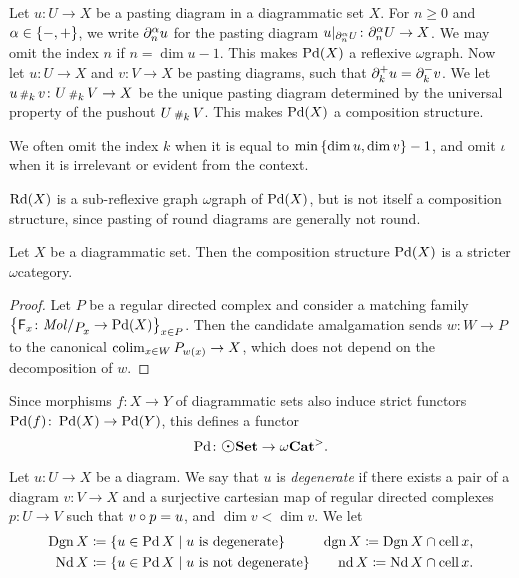 \begin{dfn} 
    Let \( u \colon U \to X \) be a pasting diagram in a diagrammatic set \( X \).
    For \( n \geq 0 \) and \( \alpha \in \left\{ {-, +} \right\} \), we write \( \partial_{n}^{\alpha} u \) for the pasting diagram \( \restr{u}{\bd{n}{\a}U} \colon \bd{n}{\a} U \to X \).
    We may omit the index \( n \) if \( n = \dim u - 1 \).
    This makes \( \operatorname{Pd}(X) \) a reflexive \( \omega \)\nbd graph.
    Now let \( u \colon U \to X \) and \( v \colon V \to X \) be pasting diagrams, such that \( \partial_{k}^{+} u = \partial_{k}^{-} v \).
    We let \( u \,{\scriptstyle\#}_{k}\, v \colon U \,{\scriptstyle\#}_{k}\, V \to X \) be the unique pasting diagram determined by the universal property of the pushout \( U \,{\scriptstyle\#}_{k}\, V \).
    This makes \( \operatorname{Pd}(X) \) a composition structure.
\end{dfn}
\noindent We often omit the index \( k \) when it is equal to \( \min \left\{ {\dim u, \dim v} \right\} - 1 \), and omit \( \iota \) when it is irrelevant or evident from the context.

\begin{rmk}
    \( \operatorname{Rd}(X) \) is a sub-reflexive graph \( \omega \)\nbd graph of \( \operatorname{Pd}(X) \), but is not itself a composition structure, since pasting of round diagrams are generally not round. 
\end{rmk}

\begin{lem} \label{lem:Pd_is_stricter}
    Let \( X \) be a diagrammatic set.
    Then the composition structure \( \operatorname{Pd}(X) \) is a stricter \( \omega \)\nbd category.
\end{lem}
\begin{proof}
    Let \( P \) be a regular directed complex and consider a matching family \( \set{\F_x \colon \molecin{\imel{P}{x}} \to \Pd(X)}_{x \in P} \).
    Then the candidate amalgamation sends \( w \colon W \to P \) to the canonical \( \operatorname*{colim}_{x \in W} {P}_{w(x)} \to X \), which does not depend on the decomposition of \( w \).
\end{proof}

\noindent Since morphisms \( f \colon X \to Y \) of diagrammatic sets also induce strict functors \( \operatorname{Pd}(f) \colon \operatorname{Pd}(X) \to \operatorname{Pd}(Y) \), this defines a functor
\begin{equation*}
    \Pd \colon \dgmSet \to \somegaCat.
\end{equation*}

\begin{dfn} 
    Let \( u \colon U \to X \) be a diagram.
    We say that \( u \) is \emph{degenerate} if there exists a pair of a diagram \( v \colon V \to X \) and a surjective cartesian map of regular directed complexes \( p \colon U \to V \) such that \( v \circ p = u \), and \( \dim v < \dim v \). 
    We let
    \begin{align*}
        \operatorname{Dgn} X &\coloneqq \left\{ {u \in \operatorname{Pd} X \mid u \text{ is degenerate}} \right\} & \operatorname{dgn} X \coloneqq \operatorname{Dgn} X \cap \operatorname{cell} x,\\
        \operatorname{Nd} X & \coloneqq \left\{ {u \in \operatorname{Pd} X \mid u \text{ is not degenerate}} \right\} & \operatorname{nd} X \coloneqq \operatorname{Nd} X \cap \operatorname{cell} x.
    \end{align*}
\end{dfn}

